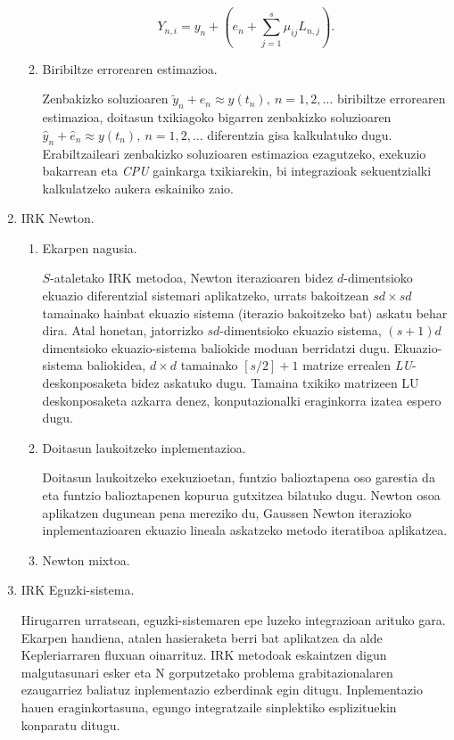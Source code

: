 \begin{enumerate}
\begin{enumerate}
\begin{equation*}
Y_{n,i}=y_n + \left(e_n+ \sum_{j=1}^{s}\mu_{ij} L_{n,j} \right).
\end{equation*}
  
\item Biribiltze errorearen estimazioa.

Zenbakizko soluzioaren $\tilde{y}_n+e_n \approx y(t_n), \ n=1,2,\dots$ biribiltze errorearen estimazioa, doitasun txikiagoko bigarren zenbakizko soluzioaren $\hat{y}_n+\hat{e}_n \approx y(t_n), \ n=1,2,\dots$  diferentzia gisa kalkulatuko dugu.
Erabiltzaileari zenbakizko soluzioaren estimazioa ezagutzeko, exekuzio bakarrean  eta \emph{CPU} gainkarga txikiarekin, bi integrazioak sekuentzialki kalkulatzeko aukera eskainiko zaio. 


\end{enumerate}


\item IRK Newton.

\begin{enumerate}
\item Ekarpen nagusia.

$S$-ataletako IRK metodoa,  Newton iterazioaren bidez $d$-dimentsioko ekuazio diferentzial  sistemari aplikatzeko, urrats bakoitzean $sd \times sd$ tamainako hainbat ekuazio sistema (iterazio bakoitzeko bat) askatu behar dira. Atal honetan, jatorrizko $sd$-dimentsioko ekuazio sistema, $(s+1)d$ dimentsioko ekuazio-sistema baliokide moduan berridatzi dugu. Ekuazio-sistema baliokidea,  $d \times d$ tamainako $[s/2]+1$ matrize errealen \emph{LU}-deskonposaketa bidez askatuko dugu. Tamaina txikiko matrizeen LU deskonposaketa azkarra denez, konputazionalki eraginkorra izatea espero dugu.   

\item Doitasun laukoitzeko inplementazioa.

Doitasun laukoitzeko exekuzioetan, funtzio balioztapena oso garestia da eta funtzio balioztapenen kopurua gutxitzea bilatuko dugu. Newton osoa aplikatzen dugunean pena mereziko du, Gaussen Newton iterazioko inplementazioaren ekuazio lineala askatzeko metodo iteratiboa aplikatzea. 

\item Newton mixtoa.


\end{enumerate}
  

\item IRK Eguzki-sistema.

Hirugarren urratsean, eguzki-sistemaren epe luzeko integrazioan arituko gara. Ekarpen handiena, atalen hasieraketa berri bat aplikatzea da alde Kepleriarraren fluxuan oinarrituz. IRK metodoak eskaintzen digun malgutasunari esker eta N gorputzetako problema grabitazionalaren ezaugarriez baliatuz inplementazio ezberdinak egin ditugu. Inplementazio hauen eraginkortasuna, egungo integratzaile sinplektiko esplizituekin konparatu ditugu.


\end{enumerate}
